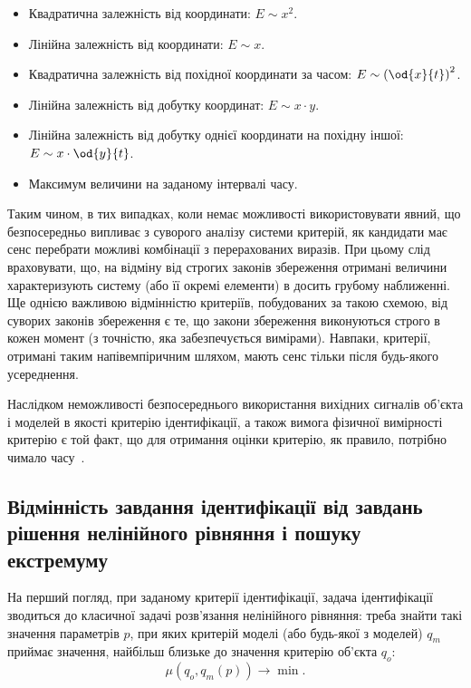 \begin{itemize}

  \item
    Квадратична залежність від координати:
    $E \sim x^2$.

  \item
    Лінійна залежність від координати:
    $E \sim x$.

  \item
    Квадратична залежність від похідної координати за часом:
    $E \sim \left( \od{x}{t}\right)^2$.

  \item
    Лінійна залежність від добутку координат:
    $E \sim x \cdot y$.

  \item
    Лінійна залежність від добутку однієї координати на похідну іншої:
    $E \sim x \cdot \od{y}{t}$.

  \item
  Максимум величини на заданому інтервалі часу.

\end{itemize}

Таким чином, в тих випадках, коли немає можливості
використовувати явний, що безпосередньо випливає з суворого
аналізу системи критерій, як кандидати має сенс перебрати
можливі комбінації з перерахованих виразів. При цьому слід
враховувати, що, на відміну від строгих законів збереження
отримані величини характеризують систему (або її окремі
елементи) в досить грубому наближенні. Ще однією важливою
відмінністю критеріїв, побудованих за такою схемою, від суворих
законів збереження є те, що закони збереження виконуються строго
в кожен момент (з точністю, яка забезпечується вимірами). Навпаки,
критерії, отримані таким напівемпіричним шляхом, мають сенс
тільки після будь-якого усереднення.

Наслідком неможливості безпосереднього використання вихідних
сигналів об'єкта і моделей в якості критерію ідентифікації,
а також вимога фізичної вимірності критерію є той факт, що
для отримання оцінки критерію, як правило, потрібно чимало
часу~\cite{atu_ich2011, atu_DSMP2016}.



\subsection{Відмінність завдання ідентифікації від завдань рішення нелінійного рівняння і пошуку екстремуму} %

На перший погляд, при заданому критерії ідентифікації, задача ідентифікації
зводиться до класичної задачі розв'язання нелінійного рівняння: треба знайти
такі значення параметрів $p$, при яких критерій моделі (або будь-якої з
моделей) $q_m$ приймає значення, найбільш близьке до значення критерію
об'єкта $q_o$:
\[
  \mu( q_o, q_m(p) ) \to \min.
\]

